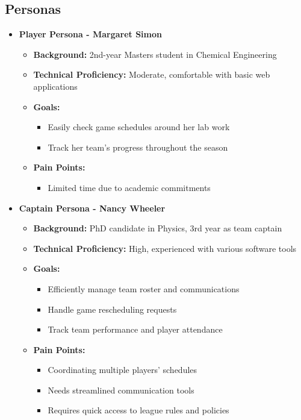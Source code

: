 \documentclass[12pt, titlepage]{article}
\begin{document}
\subsection{Personas}
\begin{itemize}
    \item \textbf{Player Persona - Margaret Simon}
    \begin{itemize}
        \item \textbf{Background:} 2nd-year Masters student in Chemical Engineering
        \item \textbf{Technical Proficiency:} Moderate, comfortable with basic web applications
        \item \textbf{Goals:}
        \begin{itemize}
            \item Easily check game schedules around her lab work
            \item Track her team's progress throughout the season
        \end{itemize}
        \item \textbf{Pain Points:}
        \begin{itemize}
            \item Limited time due to academic commitments
        \end{itemize}
    \end{itemize}

    \item \textbf{Captain Persona - Nancy Wheeler}
    \begin{itemize}
        \item \textbf{Background:} PhD candidate in Physics, 3rd year as team captain
        \item \textbf{Technical Proficiency:} High, experienced with various software tools
        \item \textbf{Goals:}
        \begin{itemize}
            \item Efficiently manage team roster and communications
            \item Handle game rescheduling requests
            \item Track team performance and player attendance
        \end{itemize}
        \item \textbf{Pain Points:}
        \begin{itemize}
            \item Coordinating multiple players' schedules
            \item Needs streamlined communication tools
            \item Requires quick access to league rules and policies
        \end{itemize}
    \end{itemize}


\end{itemize}
\end{document}
